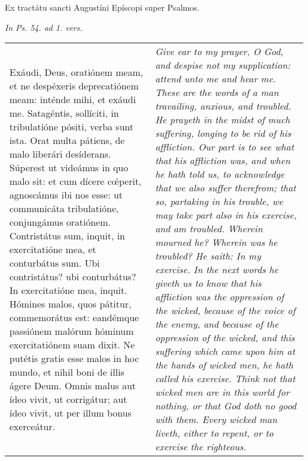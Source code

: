 \begin{center}
Ex tractátu sancti Augustíni Epíscopi super Psalmos.

\textit{\small In Ps. 54. ad 1. vers.}
\end{center}

\begin{tabular}{p{8cm} | p{8cm}}
Exáudi, Deus, oratiónem meam, et ne despéxeris deprecatiónem meam: inténde mihi, et exáudi me. Satagéntis, sollíciti, in tribulatióne pósiti, verba sunt ista. Orat multa pátiens, de malo liberári desíderans. Súperest ut videámus in quo malo sit: et cum dícere cœ́perit, agnoscámus ibi nos esse: ut communicáta tribulatióne, conjungámus oratiónem. Contristátus sum, inquit, in exercitatióne mea, et conturbátus sum. Ubi contristátus? ubi conturbátus? In exercitatióne mea, inquit. Hómines malos, quos pátitur, commemorátus est: eandémque passiónem malórum hóminum exercitatiónem suam dixit. Ne putétis gratis esse malos in hoc mundo, et nihil boni de illis ágere Deum. Omnis malus aut ídeo vivit, ut corrigátur; aut ídeo vivit, ut per illum bonus exerceátur.
& \textit{Give ear to my prayer, O God, and despise not my supplication: attend unto me and hear me. These are the words of a man travailing, anxious, and troubled. He prayeth in the midst of much suffering, longing to be rid of his affliction. Our part is to see what that his affliction was, and when he hath told us, to acknowledge that we also suffer therefrom; that so, partaking in his trouble, we may take part also in his exercise, and am troubled. Wherein mourned he? Wherein was he troubled? He saith: In my exercise. In the next words he giveth us to know that his affliction was the oppression of the wicked, because of the voice of the enemy, and because of the oppression of the wicked, and this suffering which came upon him at the hands of wicked men, he hath called his exercise. Think not that wicked men are in this world for nothing, or that God doth no good with them. Every wicked man liveth, either to repent, or to exercise the righteous.}
\end{tabular}